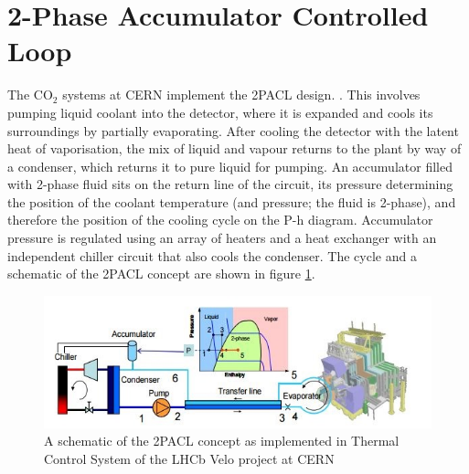 \documentclass{report}
\begin{document}
\section{2-Phase Accumulator Controlled Loop}
\FloatBarrier
The CO$_2$ systems at CERN implement the 2PACL design. \cite{TIF PoS}\cite{bart}. This involves pumping liquid coolant into the detector, where it is expanded and cools its surroundings by partially evaporating. After cooling the detector with the latent heat of vaporisation, the mix of liquid and vapour returns to the plant by way of a condenser, which returns it to pure liquid for pumping. An accumulator filled with 2-phase fluid sits on the return line of the circuit, its pressure determining the position of the coolant temperature (and pressure; the fluid is 2-phase), and therefore the position of the cooling cycle on the P-h diagram. Accumulator pressure is regulated using an array of heaters and a heat exchanger with an independent chiller circuit that also cools the condenser. The cycle and a schematic of the 2PACL concept are shown in figure \ref{fig:2PACL}.
\begin{figure}[h!]
\includegraphics{2PACLschem}
\caption{A schematic of the 2PACL concept as implemented in Thermal Control System of the LHCb Velo project at CERN \cite{CO2 PoS}}
\label{fig:2PACL}
\end{figure}
\end{document}
